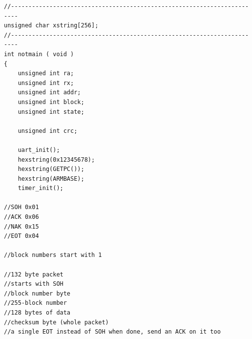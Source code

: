 \begin{lstlisting}[caption={bootloader05.c},label={lst:bootloader}]
//------------------------------------------------------------------------
unsigned char xstring[256];
//------------------------------------------------------------------------
int notmain ( void )
{
    unsigned int ra;
    unsigned int rx;
    unsigned int addr;
    unsigned int block;
    unsigned int state;

    unsigned int crc;

    uart_init();
    hexstring(0x12345678);
    hexstring(GETPC());
    hexstring(ARMBASE);
    timer_init();

//SOH 0x01
//ACK 0x06
//NAK 0x15
//EOT 0x04

//block numbers start with 1

//132 byte packet
//starts with SOH
//block number byte
//255-block number
//128 bytes of data
//checksum byte (whole packet)
//a single EOT instead of SOH when done, send an ACK on it too


\end{lstlisting}
